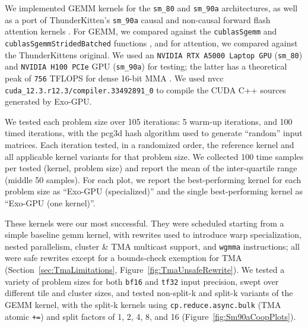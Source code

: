 
We implemented GEMM kernels for the \texttt{sm\_80} and \texttt{sm\_90a} architectures,
as well as a port of ThunderKitten's \texttt{sm\_90a} causal and non-causal forward flash attention kernels \cite{thunderkittens:mha_h100, shah2024flashattention3fastaccurateattention}.
For GEMM, we compared against the \texttt{cublasSgemm} and \texttt{cublasSgemmStridedBatched} functions \cite{cublas},
and for attention, we compared against the ThunderKittens original.
We used an \texttt{NVIDIA RTX A5000 Laptop GPU} (\texttt{sm\_80})
and \texttt{NVIDIA H100 PCIe} GPU (\texttt{sm\_90a}) for testing;
the latter has a theoretical peak of \texttt{756} TFLOPS for dense 16-bit MMA \cite{nvidia:h100-datasheet}.
We used nvcc \texttt{cuda\_12.3.r12.3/compiler.33492891\_0} to compile the CUDA C++ sources generated by Exo-GPU.

We tested each problem size over 105 iterations: 5 warm-up iterations, and 100 timed iterations,
with the pcg3d hash algorithm \cite{pcg3d} used to generate ``random'' input matrices.
Each iteration tested, in a randomized order, the reference kernel and all applicable
\sporkName{} kernel variants for that problem size.
We collected 100 time samples per tested (kernel, problem size)
and report the mean of the inter-quartile range (middle 50 samples).
For each plot, we report the best-performing \sporkName{} kernel for each problem size as \textsf{``Exo-GPU (specialized)''}
and the single best-performing \sporkName{} kernel as \textsf{``Exo-GPU (one kernel)''}.





These kernels were our most successful.
They were scheduled starting from a simple baseline gemm kernel,
with rewrites used to introduce warp specialization, nested parallelism,
cluster \& TMA multicast support, and \texttt{wgmma} instructions;
all were safe rewrites except for a bounds-check exemption for TMA
(Section~\ref{sec:TmaLimitations}, Figure~\ref{fig:TmaUnsafeRewrite}).
We tested a variety of problem sizes for both \texttt{bf16} and \texttt{tf32} input precision,
swept over different tile and cluster sizes,
and tested non-split-k and split-k variants of the GEMM kernel,
with the split-k kernels using \texttt{cp.reduce.async.bulk} (TMA atomic \texttt{+=})
and split factors of 1, 2, 4, 8, and 16 (Figure~\ref{fig:Sm90aCoopPlots}).

